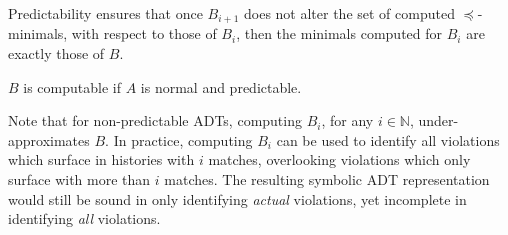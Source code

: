 Predictability ensures that once $B_{i+1}$ does not alter the set of computed
$\preceq$-minimals, with respect to those of $B_i$, then the minimals computed
for $B_i$ are exactly those of $B$.

\begin{lemma}

  $B$ is computable if $A$ is normal and predictable.

\end{lemma}

Note that for non-predictable ADTs, computing $B_i$, for any $i \in
\mathbb{N}$, under-approximates $B$. In practice, computing $B_i$ can be used
to identify all violations which surface in histories with $i$ matches,
overlooking violations which only surface with more than $i$ matches. The
resulting symbolic ADT representation would still be sound in only identifying
\emph{actual} violations, yet incomplete in identifying \emph{all} violations.

